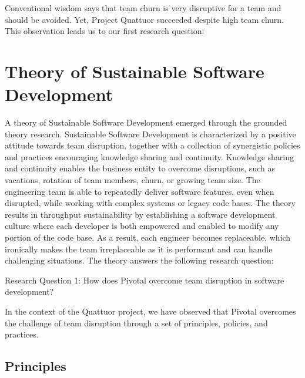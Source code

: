 Conventional wisdom says that team churn is very disruptive for a team and should be avoided. Yet, Project Quattuor succeeded despite high team churn. This observation leads us to our first research question: 

\section{Theory of Sustainable Software Development}
\label{Theory}

A theory of Sustainable Software Development emerged through the grounded theory research. Sustainable Software Development is characterized by a positive attitude towards team disruption, together with a collection of synergistic policies and practices encouraging knowledge sharing and continuity. Knowledge sharing and continuity enables the business entity to overcome disruptions, such as vacations, rotation of team members, churn, or growing team size. The engineering team is able to repeatedly deliver software features, even when disrupted, while working with complex systems or legacy code bases. The theory results in throughput sustainability by establishing a software development culture where each developer is both empowered and enabled to modify any portion of the code base. As a result, each engineer becomes replaceable, which ironically makes the team irreplaceable as it is performant and can handle challenging situations. The theory answers the following research question:

Research Question 1: How does Pivotal overcome team disruption in software development?

In the context of the Quattuor project, we have observed that Pivotal overcomes the challenge of team disruption through a set of principles, policies, and practices.

\subsection{Principles}

